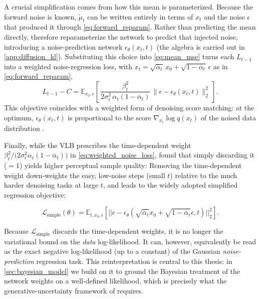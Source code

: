 A crucial simplification \parencite{ho_denoising_2020} comes from how this mean is parameterized. Because the forward noise is known, $\tilde{\mu}_t$ can be written entirely in terms of $x_t$ and the noise $\epsilon$ that produced it through \autoref{eq:forward_reparam}. Rather than predicting the mean directly, \textcite{ho_denoising_2020} therefore reparameterize the network to predict that injected noise, introducing a noise-prediction network $\epsilon_\theta(x_t, t)$ (the algebra is carried out in \autoref{app:diffusion_kl}). Substituting this choice into \autoref{eq:mean_mse} turns each $L_{t-1}$ into a weighted noise-regression loss, with $x_t = \sqrt{\overline{\alpha}_t}\,x_0 + \sqrt{1-\overline{\alpha}_t}\,\epsilon$ as in \autoref{eq:forward_reparam},
\begin{equation}
\label{eq:weighted_noise_loss}
    L_{t-1} - C = \mathbb{E}_{x_0,\epsilon}\left[\, \frac{\beta_t^2}{2\sigma_t^2\,\alpha_t (1-\overline{\alpha}_t)}\,\|\epsilon - \epsilon_\theta(x_t, t)\|_2^2 \,\right].
\end{equation}
This objective coincides with a weighted form of denoising score matching: at the optimum, $\epsilon_\theta(x_t,t)$ is proportional to the score $\nabla_{x_t} \log q(x_t)$ of the noised data distribution \parencite{ho_denoising_2020, song_score-based_2021}.

Finally, while the VLB prescribes the time-dependent weight $\beta_t^2 / \big(2\sigma_t^2\alpha_t(1-\overline{\alpha}_t)\big)$ in \autoref{eq:weighted_noise_loss}, \textcite{ho_denoising_2020} found that simply discarding it ($=1$) yields higher perceptual sample quality: Removing the time-dependent weight down-weights the easy, low-noise steps (small $t$) relative to the much harder denoising tasks at large $t$, and leads to the widely adopted simplified regression objective:

\begin{equation}
\label{eq:simple_loss}
    \mathcal{L}_{\mathrm{simple}}(\theta) = \mathbb{E}_{t,x_{0},\epsilon} \left[ ||\epsilon - \epsilon_{\theta}(\sqrt{\overline{\alpha}_{t}}x_{0} + \sqrt{1-\overline{\alpha}_{t}}\epsilon, t)||_{2}^{2} \right].
\end{equation}

Because $\mathcal{L}_{\mathrm{simple}}$ discards the time-dependent weights, it is no longer the variational bound on the \emph{data} log-likelihood. It can, however, equivalently be read as the exact negative log-likelihood (up to a constant) of the Gaussian \emph{noise-prediction} regression task. This reinterpretation is central to this thesis: in \autoref{sec:bayesian_model} we build on it to ground the Bayesian treatment of the network weights on a well-defined likelihood, which is precisely what the generative-uncertainty framework of \textcite{jazbec_generative_2025} requires.

